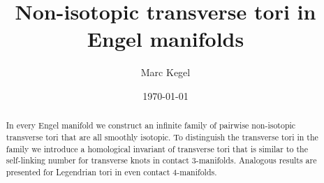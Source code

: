 \documentclass{amsart} %
\theoremstyle{thm}
\theoremstyle{definition}
\begin{document}

\title[Non-isotopic transverse tori in Engel manifolds]{Non-isotopic transverse tori in Engel manifolds} %

\author{Marc Kegel}
\address{Humboldt-Universit\"at zu Berlin, Rudower Chaussee 25, 12489 Berlin, Germany.}




\begin{abstract}
In every Engel manifold we construct an infinite family of pairwise non-isotopic transverse tori that are all smoothly isotopic. To distinguish the transverse tori in the family we introduce a homological invariant of transverse tori that is similar to the self-linking number for transverse knots in contact $3$-manifolds. Analogous results are presented for Legendrian tori in even contact $4$-manifolds. 
\end{abstract}

\date{\today} %

\end{document}
